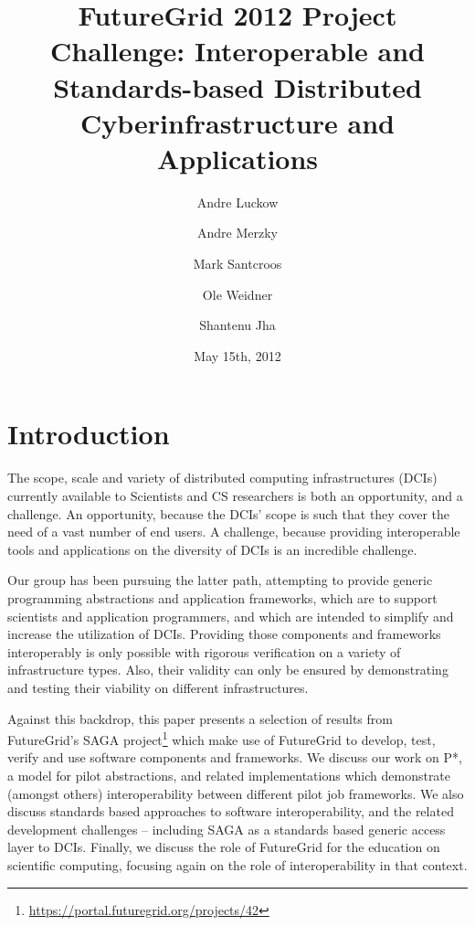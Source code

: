 \documentclass[]{paper}
\begin{document}
\title{FutureGrid 2012 Project Challenge: Interoperable and
  Standards-based Distributed Cyberinfrastructure and Applications}
 
\author{Andre Luckow 
  \and Andre Merzky
  \and Mark Santcroos
  \and Ole Weidner 
  \and Shantenu Jha
}
\date{May 15th, 2012}
\maketitle


\section{Introduction}

The scope, scale and variety of distributed computing infrastructures
(DCIs) currently available to Scientists and CS researchers is both an
opportunity, and a challenge.  An opportunity, because the DCIs' scope
is such that they cover the need of a vast number of end users. A
challenge, because providing interoperable tools and applications on
the diversity of DCIs is an incredible challenge.

Our group has been pursuing the latter path, attempting to provide
generic programming abstractions and application frameworks, which are
to support scientists and application programmers, and which are
intended to simplify and increase the utilization of DCIs.  Providing
those components and frameworks interoperably is only possible with
rigorous verification on a variety of infrastructure types.  Also,
their validity can only be ensured by demonstrating and testing their
viability on different infrastructures.

Against this backdrop, this paper presents a selection of results from
FutureGrid's SAGA
project\footnote{\url{https://portal.futuregrid.org/projects/42}}
which make use of FutureGrid to develop, test, verify and use software
components and frameworks.  We discuss our work on P*, a model for
pilot abstractions, and related implementations which demonstrate
(amongst others) interoperability between different pilot job
frameworks.  We also discuss standards based approaches to software
interoperability, and the related development challenges -- including
SAGA as a standards based generic access layer to DCIs.  Finally, we
discuss the role of FutureGrid for the education on scientific
computing, focusing again on the role of interoperability in that
context.
\end{document}
